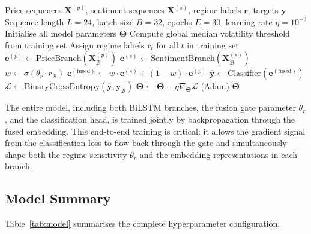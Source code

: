 \documentclass[journal]{IEEEtran}
\newcommand{\bilstm}{BiLSTM}
\begin{document}
\begin{algorithm}[!t]
\caption{RAML Training Procedure}
\label{alg:training}
\begin{algorithmic}[1]
\REQUIRE Price sequences $\mathbf{X}^{(p)}$, sentiment sequences
  $\mathbf{X}^{(s)}$, regime labels $\mathbf{r}$, targets $\mathbf{y}$
\REQUIRE Sequence length $L{=}24$, batch size $B{=}32$, epochs $E{=}30$,
  learning rate $\eta{=}10^{-3}$
\STATE Initialise all model parameters $\boldsymbol{\Theta}$
\STATE Compute global median volatility threshold from training set
\STATE Assign regime labels $r_t$ for all $t$ in training set
    \STATE $\mathbf{e}^{(p)} \leftarrow \text{PriceBranch}(\mathbf{X}^{(p)}_\mathcal{B})$
    \STATE $\mathbf{e}^{(s)} \leftarrow \text{SentimentBranch}(\mathbf{X}^{(s)}_\mathcal{B})$
    \STATE $w \leftarrow \sigma(\theta_r \cdot r_\mathcal{B})$
    \STATE $\mathbf{e}^{(\mathrm{fused})} \leftarrow w \cdot \mathbf{e}^{(s)}
      + (1-w) \cdot \mathbf{e}^{(p)}$
    \STATE $\hat{\mathbf{y}} \leftarrow \text{Classifier}(\mathbf{e}^{(\mathrm{fused})})$
    \STATE $\mathcal{L} \leftarrow \text{BinaryCrossEntropy}(\hat{\mathbf{y}},
      \mathbf{y}_\mathcal{B})$
    \STATE $\boldsymbol{\Theta} \leftarrow \boldsymbol{\Theta}
      - \eta \nabla_{\boldsymbol{\Theta}} \mathcal{L}$ \quad (Adam)
  \ENDFOR
\ENDFOR
\RETURN $\boldsymbol{\Theta}$
\end{algorithmic}
\end{algorithm}

The entire model, including both \bilstm{} branches, the fusion gate parameter
$\theta_r$, and the classification head, is trained jointly by backpropagation
through the fused embedding. This end-to-end training is critical: it allows the
gradient signal from the classification loss to flow back through the gate and
simultaneously shape both the regime sensitivity $\theta_r$ and the embedding
representations in each branch.

\subsection{Model Summary}
Table~\ref{tab:model} summarises the complete hyperparameter configuration.
\end{document}
